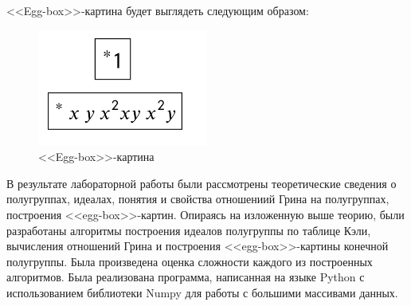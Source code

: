 \documentclass[bachelor, och, labwork]{shiza}
\begin{document}
      <<Egg-box>>-картина будет выглядеть следующим образом:

      \begin{figure}[H]
        \centering
        \includegraphics[width=0.5\textwidth]{photo/egg-box2.png}
        \caption{<<Egg-box>>-картина}
      \end{figure}

    \conclusion
    
    В результате лабораторной работы были рассмотрены теоретические сведения о полугруппах, идеалах, понятия и свойства отношениий Грина на полугруппах,
    построения <<egg-box>>-картин. Опираясь на изложенную выше теорию, были разработаны алгоритмы построения идеалов полугруппы по таблице Кэли,
    вычисления отношений Грина и построения <<egg-box>>-картины конечной полугруппы. Была произведена оценка сложности каждого из построенных
    алгоритмов. Была реализована программа, написанная на языке Python с использованием библиотеки Numpy для работы с большими массивами данных.
    
\end{document}
